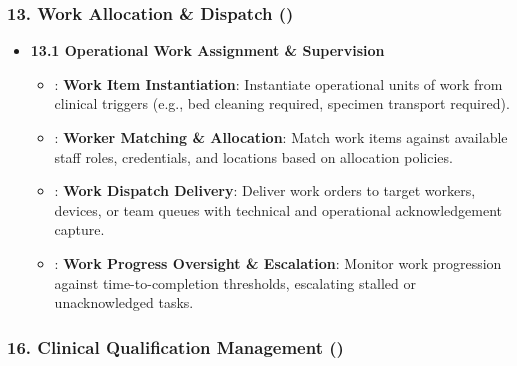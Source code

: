 \subsubsection*{13. Work Allocation \& Dispatch (\texttt{})}
\label{rad:enabling:531}

\begin{itemize}

\item 
\textbf{13.1 Operational Work Assignment \& Supervision}


\begin{itemize}

\item 
\texttt{}: \textbf{Work Item Instantiation}: Instantiate operational units of work from clinical triggers (e.g., bed cleaning required, specimen transport required).



\item 
\texttt{}: \textbf{Worker Matching \& Allocation}: Match work items against available staff roles, credentials, and locations based on allocation policies.



\item 
\texttt{}: \textbf{Work Dispatch Delivery}: Deliver work orders to target workers, devices, or team queues with technical and operational acknowledgement capture.



\item 
\texttt{}: \textbf{Work Progress Oversight \& Escalation}: Monitor work progression against time-to-completion thresholds, escalating stalled or unacknowledged tasks.



\end{itemize}


\end{itemize}
\label{rad:enabling:537}



\label{rad:enabling:539}
\subsubsection*{16. Clinical Qualification Management (\texttt{})}
\label{rad:enabling:540}

